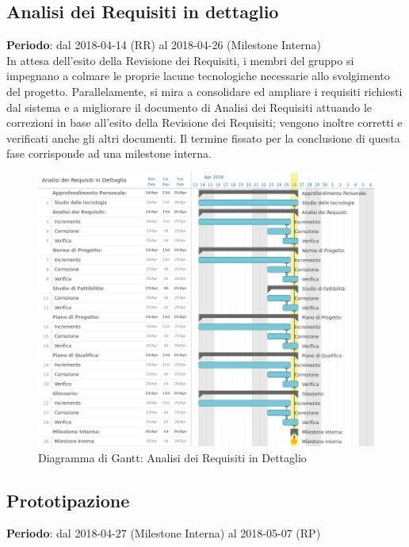 \subsection{Analisi dei Requisiti in dettaglio}
\textbf{Periodo}: dal 2018-04-14 (RR) al 2018-04-26 (Milestone Interna)\\

In attesa dell'esito della Revisione dei Requisiti, i membri del gruppo si impegnano a colmare le proprie lacune tecnologiche necessarie allo svolgimento del progetto. Parallelamente, si mira a consolidare ed ampliare i requisiti richiesti dal sistema e a migliorare il documento di Analisi dei Requisiti attuando le correzioni in base all’esito della Revisione dei Requisiti; vengono inoltre corretti e verificati anche gli altri documenti. Il termine fissato per la conclusione di questa fase corrisponde ad una milestone interna.\\ 

\begin{figure}
	\centerline{\includegraphics[scale=0.5]{img/DiagrammiGantt/AnalisiRequisitiDettaglio.jpg}}
	\caption{Diagramma di Gantt: Analisi dei Requisiti in Dettaglio}
\end{figure}
\clearpage

\subsection{Prototipazione}
\textbf{Periodo}: dal 2018-04-27 (Milestone Interna) al 2018-05-07 (RP)\\

